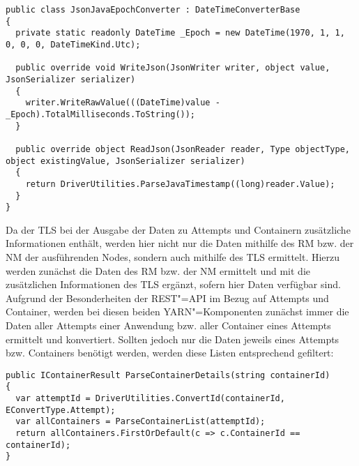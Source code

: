 \begin{lstlisting}[label=lst:javaEpochConverter,style=cs,
caption={[Entwickelter Konverter für Java"=Zeitstempel zur Nutzung mit Json.NET]
    Entwickelter Konverter für Java"=Zeitstempel zur Nutzung mit Json.NET.
    Dieser erbt dafür von \texttt{DateTimeConverterBase} des Json.NET"=Frameworks, damit der \texttt{JsonJavaEpochConverter} auch zur Konvertierung genutzt werden kann.}]
public class JsonJavaEpochConverter : DateTimeConverterBase
{
  private static readonly DateTime _Epoch = new DateTime(1970, 1, 1, 0, 0, 0, DateTimeKind.Utc);

  public override void WriteJson(JsonWriter writer, object value, JsonSerializer serializer)
  {
    writer.WriteRawValue(((DateTime)value - _Epoch).TotalMilliseconds.ToString());
  }
  
  public override object ReadJson(JsonReader reader, Type objectType, object existingValue, JsonSerializer serializer)
  {
    return DriverUtilities.ParseJavaTimestamp((long)reader.Value);
  }
}
\end{lstlisting}

Da der \gls{TLS} bei der Ausgabe der Daten zu Attempts und Containern zusätzliche Informationen enthält, werden hier nicht nur die Daten mithilfe des \gls{RM} bzw. der \gls{NM} der ausführenden Nodes, sondern auch mithilfe des \gls{TLS} ermittelt.
Hierzu werden zunächst die Daten des \gls{RM} bzw. der \gls{NM} ermittelt und mit die zusätzlichen Informationen des \gls{TLS} ergänzt, sofern hier Daten verfügbar sind.
Aufgrund der Besonderheiten der REST"=API im Bezug auf Attempts und Container, werden bei diesen beiden YARN"=Komponenten zunächst immer die Daten aller Attempts einer Anwendung bzw. aller Container eines Attempts ermittelt und konvertiert.
Sollten jedoch nur die Daten jeweils eines Attempts bzw. Containers benötigt werden, werden diese Listen entsprechend gefiltert:

\begin{lstlisting}[label=lst:restParseDetails,style=cs,
caption={[Konvertierung und Rückgabe eines Containers durch den RestParser]
    Konvertierung und Rückgabe eines Containers durch den \texttt{RestParser}.
    Hierbei muss für den hier gezeigten, einzelnen Container zunächst die ID des übergeordneten Attempts ermittelt werden, bevor aus der Liste aller Container die Daten des gesuchten Containers zurückgegeben werden können.
    Bei Attempts ist dieses Vorgehen analog.}]
public IContainerResult ParseContainerDetails(string containerId)
{
  var attemptId = DriverUtilities.ConvertId(containerId, EConvertType.Attempt);
  var allContainers = ParseContainerList(attemptId);
  return allContainers.FirstOrDefault(c => c.ContainerId == containerId);
}
\end{lstlisting}

